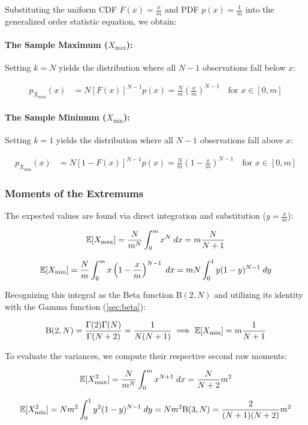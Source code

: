 Substituting the uniform CDF $F(x) = \frac{x}{m}$ and PDF $p(x) = \frac{1}{m}$ into the generalized order statistic equation, we obtain:

\paragraph{The Sample Maximum ($X_{\max}$):}
Setting $k=N$ yields the distribution where all $N-1$ observations fall below $x$:

\begin{align*}
	p_{X_{\max}}(x) &= N [F(x)]^{N-1} p(x) = \frac{N}{m}\left(\frac{x}{m}\right)^{N-1} \quad \text{for } x \in [0,m]
\end{align*}

\paragraph{The Sample Minimum ($X_{\min}$):}
Setting $k=1$ yields the distribution where all $N-1$ observations fall above $x$:

\begin{align*}
	p_{X_{\min}}(x) &= N [1-F(x)]^{N-1} p(x) = \frac{N}{m}\left(1-\frac{x}{m}\right)^{N-1} \quad \text{for } x \in [0,m]
\end{align*}

\subsubsection{Moments of the Extremums}
The expected values are found via direct integration and substitution ($y = \frac{x}{m}$):

	\[
	\mathbb{E}[X_{\max}] = \frac{N}{m^N}\int_{0}^{m}x^N\;dx = m \frac{N}{N+1}
	\]

	\[
	\mathbb{E}[X_{\min}] = \frac{N}{m}\int_{0}^{m}x\left(1-\frac{x}{m}\right)^{N-1}\;dx = m N \int_0^1 y(1-y)^{N-1}\;dy
	\]

Recognizing this integral as the Beta function $\mathrm{B}(2, N)$ and utilizing its identity with the Gamma function (\ref{sec:beta}):

	\[
	\mathrm{B}(2,N) = \frac{\Gamma(2)\Gamma(N)}{\Gamma(N+2)} = \frac{1}{N(N+1)} \implies \mathbb{E}[X_{\min}] = m \frac{1}{N+1}
	\]

To evaluate the variances, we compute their respective second raw moments:

	\[
	\mathbb{E}[X_{\max}^2] = \frac{N}{m^N}\int_0^mx^{N+1}\;dx = \frac{N}{N+2}m^2
	\]

	\[
	\mathbb{E}[X_{\min}^2] = N m^2 \int_0^1 y^2(1-y)^{N-1}\;dy = N m^2 \mathrm{B}(3,N) = \frac{2}{(N+1)(N+2)} m^2
	\]

